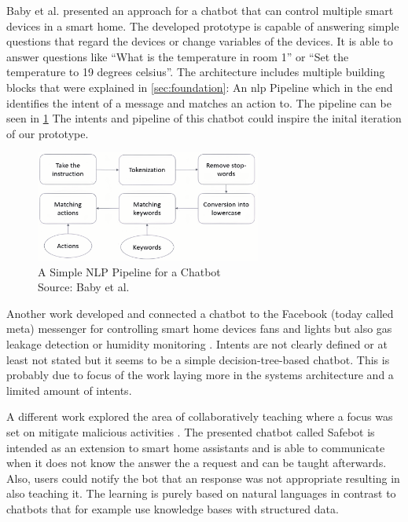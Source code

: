 Baby et al. \cite{baby_home_2017} presented an approach for a chatbot that can control multiple smart devices in a smart home.
The developed prototype is capable of answering simple questions that regard the devices or change variables of the devices.
It is able to answer questions like ``What is the temperature in room 1'' or ``Set the temperature to 19 degrees celsius''.
The architecture includes multiple building blocks that were explained in \cref{sec:foundation}: An \gls{nlp} Pipeline which in the end identifies the intent of a message and matches an action to.
The pipeline can be seen in \cref{fig:chatbot-pipeline-baby}
The intents and pipeline of this chatbot could inspire the inital iteration of our prototype. 
\begin{figure}[h]
\centering
\includegraphics[width=0.66\textwidth]{graphics/baby2017chatbot.png}
\caption{A Simple NLP Pipeline for a Chatbot \\Source: Baby et al. \cite{baby_home_2017}}
\label{fig:chatbot-pipeline-baby}
\end{figure}

Another work developed and connected a chatbot to the Facebook (today called meta) messenger for controlling smart home devices fans and lights but also gas leakage detection or humidity monitoring \cite{ahmed_smart_2020}.
Intents are not clearly defined or at least not stated but it seems to be a simple decision-tree-based chatbot.
This is probably due to focus of the work laying more in the systems architecture and a limited amount of intents.

A different work explored the area of collaboratively teaching where a focus was set on mitigate malicious activities \cite{chkroun_safe_2021}.
The presented chatbot called Safebot is intended as an extension to smart home assistants and is able to communicate when it does not know the answer the a request and can be taught afterwards.
Also, users could notify the bot that an response was not appropriate resulting in also teaching it.
The learning is purely based on natural languages in contrast to chatbots that for example use knowledge bases with structured data.

